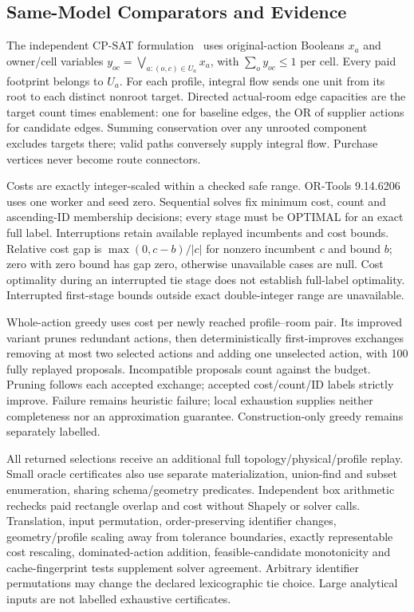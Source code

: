 \subsection{Same-Model Comparators and Evidence}
The independent CP-SAT formulation~\cite{cpsat} uses original-action Booleans $x_a$ and owner/cell variables $y_{oc}=\bigvee_{a:(o,c)\in U_a}x_a$, with $\sum_o y_{oc}\le1$ per cell. Every paid footprint belongs to $U_a$. For each profile, integral flow sends one unit from its root to each distinct nonroot target. Directed actual-room edge capacities are the target count times enablement: one for baseline edges, the OR of supplier actions for candidate edges. Summing conservation over any unrooted component excludes targets there; valid paths conversely supply integral flow. Purchase vertices never become route connectors.

Costs are exactly integer-scaled within a checked safe range. OR-Tools 9.14.6206 uses one worker and seed zero. Sequential solves fix minimum cost, count and ascending-ID membership decisions; every stage must be OPTIMAL for an exact full label. Interruptions retain available replayed incumbents and cost bounds. Relative cost gap is $\max(0,c-b)/|c|$ for nonzero incumbent $c$ and bound $b$; zero with zero bound has gap zero, otherwise unavailable cases are null. Cost optimality during an interrupted tie stage does not establish full-label optimality. Interrupted first-stage bounds outside exact double-integer range are unavailable.

Whole-action greedy uses cost per newly reached profile--room pair. Its improved variant prunes redundant actions, then deterministically first-improves exchanges removing at most two selected actions and adding one unselected action, with 100 fully replayed proposals. Incompatible proposals count against the budget. Pruning follows each accepted exchange; accepted cost/count/ID labels strictly improve. Failure remains heuristic failure; local exhaustion supplies neither completeness nor an approximation guarantee. Construction-only greedy remains separately labelled.

All returned selections receive an additional full topology/physical/profile replay. Small oracle certificates also use separate materialization, union-find and subset enumeration, sharing schema/geometry predicates. Independent box arithmetic rechecks paid rectangle overlap and cost without Shapely or solver calls. Translation, input permutation, order-preserving identifier changes, geometry/profile scaling away from tolerance boundaries, exactly representable cost rescaling, dominated-action addition, feasible-candidate monotonicity and cache-fingerprint tests supplement solver agreement. Arbitrary identifier permutations may change the declared lexicographic tie choice. Large analytical inputs are not labelled exhaustive certificates.

